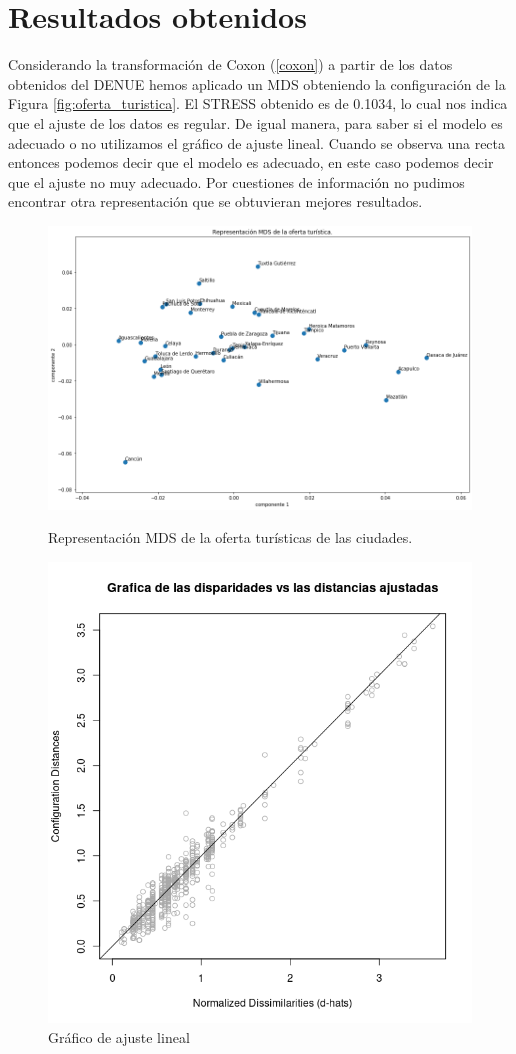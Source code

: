 \documentclass[11pt,letterpaper]{article}
\begin{document}
\section{Resultados obtenidos}
Considerando la transformación de Coxon (\ref{coxon}) a partir de los datos obtenidos del DENUE hemos aplicado un MDS obteniendo la configuración de la Figura \ref{fig:oferta_turistica}. El STRESS obtenido es de 0.1034, lo cual nos indica que el ajuste de los datos es regular. De igual manera, para saber si el modelo es adecuado o no utilizamos el gráfico de ajuste lineal. Cuando se observa una recta entonces podemos decir que el modelo es adecuado, en este caso podemos decir que el ajuste no muy adecuado. Por cuestiones de información no pudimos encontrar otra representación que se obtuvieran mejores resultados.
\begin{figure}[H]
  \includegraphics[width=\linewidth]{figure/oferta_turistica_c.png}
  \caption{Representación MDS de la oferta turísticas de las ciudades.}\label{fig:oferta_turistica}
\endminipage\hfill
{}
  \includegraphics[width=\linewidth]{figure/line_oferta.png}\caption{Gráfico de ajuste lineal}\label{line_oferta}

\end{figure}
\end{document}
